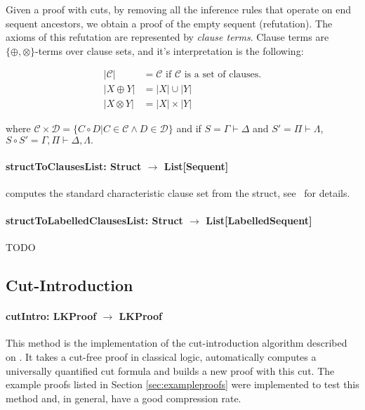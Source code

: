 \documentclass[a4paper, 11pt]{report}
\begin{document}
Given a proof with cuts, by removing all the inference rules that operate on end
sequent ancestors, we obtain a proof of the empty sequent (refutation). The
axioms of this refutation are represented by \textit{clause terms}. Clause
terms are $\{\oplus, \otimes\}$-terms over clause sets, and it's interpretation
is the following:

\begin{align*}
|\mathcal{C}| &= \mathcal{C} \text{ if $\mathcal{C}$ is a set of clauses.}\\
|X \oplus Y| &= |X| \cup |Y|\\
|X \otimes Y| &= |X| \times |Y|
\end{align*}

where $\mathcal{C} \times \mathcal{D} = \{ C \circ D | C \in \mathcal{C} \wedge
D \in \mathcal{D}\}$ and if $S = \Gamma \vdash \Delta$ and $S' = \Pi \vdash
\Lambda$, $S \circ S' = \Gamma, \Pi \vdash \Delta, \Lambda.$

\paragraph{\textbf{structToClausesList: Struct $\rightarrow$ List[Sequent]}} computes
the standard characteristic clause set
from the struct, see~\cite[Section 4.2.1]{WoltzenlogelPaleo09General} for details.

\paragraph{\textbf{structToLabelledClausesList: Struct $\rightarrow$ List[LabelledSequent]}}
{\color{red}TODO}

\subsection{Cut-Introduction}

\paragraph{\textbf{cutIntro: LKProof $\rightarrow$ LKProof}}
This method is the implementation of the cut-introduction algorithm described on
\cite{Hetzl2012}. It takes a cut-free proof in classical logic, automatically
computes a universally quantified cut formula and builds a new proof with this
cut. The example proofs listed in Section \ref{sec:exampleproofs} were
implemented to test this method and, in general, have a good compression rate.
\end{document}
